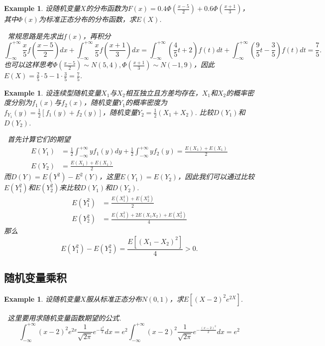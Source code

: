 \documentclass{article}
\newtheorem{example}[theorem]{Example}
\newcommand{\hints}{{\color{blue} \text{hints}}}
\begin{document}
\begin{example}
\rm 设随机变量$X$的分布函数为$F(x) = 0.4\Phi(\frac{x-5}{2})+0.6\Phi(\frac{x+1}{3})$，其中$\Phi(x)$为标准正态分布的分布函数，求$E(X)$.

\hints\ 常规思路是先求出$f(x)$，再积分
$$
\int_{-\infty}^{+\infty} \frac{x}{5}f \left(\frac{x-5}{2}\right)dx + \int_{-\infty}^{+\infty} \frac{x}{5}f\left(\frac{x+1}{3}\right)dx = \int_{-\infty}^{+\infty}\left(\frac{4}{5}t+2\right)f(t)dt + \int_{-\infty}^{+\infty} \left(\frac{9}{5}t - \frac{3}{5}\right)f(t)dt = \frac{7}{5}. 
$$
也可以这样思考$\Phi(\frac{x-5}{2}) \sim N(5,4), \Phi(\frac{x+1}{3}) \sim N(-1,9)$，因此$E(X) = \frac{2}{5} \cdot 5 - 1 \cdot \frac{3}{5}= \frac{7}{5}$.
\end{example}


\begin{example}
\rm 设连续型随机变量$X_1$与$X_2$相互独立且方差均存在，$X_1$和$X_2$的概率密度分别为$f_1(x)$与$f_2(x)$，随机变量$Y_1$的概率密度为$f_{Y_1}(y) = \frac{1}{2}[f_1(y)+f_2(y)]$，随机变量$Y_2=\frac{1}{2}(X_1 + X_2)$. 比较$D(Y_1)$和$D(Y_2)$.

\hints\ 首先计算它们的期望
$$
\begin{aligned}
E(Y_1) &= \frac{1}{2}\int_{-\infty}^{+\infty}yf_1(y)dy + \frac{1}{2}\int_{-\infty}^{+\infty}yf_2(y) = \frac{E(X_1)+E(X_1)}{2} \\
E(Y_2) &= \frac{E(X_1)+E(X_1)}{2}
\end{aligned}
$$
而$D(Y) = E(Y^2) - E^2(Y)$，这里$E(Y_1) = E(Y_2)$，因此我们可以通过比较$E(Y_1^2)$和$E(Y_2^2)$来比较$D(Y_1)$和$D(Y_2)$. 
$$
\begin{aligned}
E(Y_1^2) &= \frac{E(X_1^2)+E(X_2^2)}{2} \\
E(Y_2^2) &= \frac{E(X_1^2) + 2E(X_1X_2) + E(X_2^2)}{4}
\end{aligned}
$$
那么
$$
E(Y_1^2) - E(Y_2^2) = \frac{E[(X_1-X_2)^2]}{4} > 0. 
$$
\end{example}

\subsection{随机变量乘积}

\begin{example}
\rm 设随机变量$X$服从标准正态分布$N(0,1)$，求$E[(X-2)^2e^{2X}]$.

\hints\ 这里要用求随机变量函数期望的公式. 
$$
\int_{-\infty}^{+\infty} (x-2)^2 e^{2x} \frac{1}{\sqrt{2\pi}}e^{-\frac{x^2}{2}} dx = e^2  \int_{-\infty}^{+\infty}(x-2)^2 \frac{1}{\sqrt{2\pi}} e^{-\frac{(x-2)^2}{2}} dx = e^2 
$$
\end{example}
\end{document}
